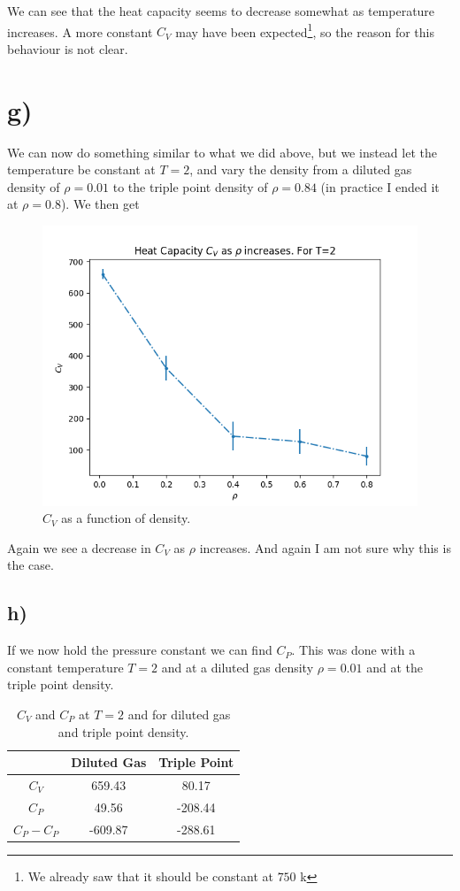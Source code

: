 \documentclass[a4paper,norsk, 10pt]{article}
\begin{document}
We can see that the heat capacity seems to decrease somewhat as temperature increases. A more constant $C_V$ may have been expected\footnote{We already saw that it should be constant at $750$ k}, so the reason for this behaviour is not clear.

\section{g)}

We can now do something similar to what we did above, but we instead let the temperature be constant at $T=2$, and vary the density from a diluted gas density of $\rho = 0.01$ to the triple point density of $\rho = 0.84$ (in practice I ended it at $\rho = 0.8$). We then get

\begin{figure}[H]
\centering
\includegraphics[scale=0.5]{CVvsRho.png}
\caption{$C_V$ as a function of density.}
\label{fig:isoTherm}
\end{figure}

Again we see a decrease in $C_V$ as $\rho$ increases. And again I am not sure why this is the case.

\subsection{h)}
If we now hold the pressure constant we can find $C_P$. This was done with a constant temperature $T=2$ and at a diluted gas density $\rho = 0.01$ and at the triple point density.

\begin{table}[H]
\centering
\begin{tabular}{c|c|c}
& Diluted Gas & Triple Point\\
\hline
$C_V$ & 659.43 & 80.17\\
$C_P$ & 49.56 & -208.44\\
$C_P - C_P$ & -609.87 & -288.61
\end{tabular}
\caption{$C_V$ and $C_P$ at $T=2$ and for diluted gas and triple point density.}
\end{table}
\end{document}
